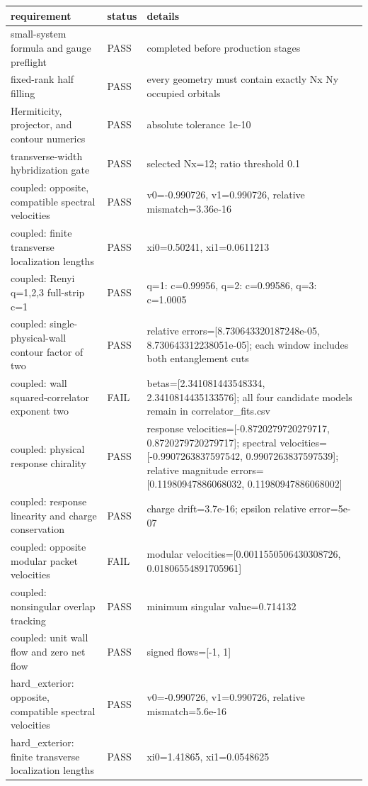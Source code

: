 \documentclass[aps,prb,onecolumn,nofootinbib,superscriptaddress]{revtex4-2}
\begin{document}
\begin{longtable}{p{}p{}p{}}
\toprule
requirement & status & details \\
\midrule
small-system formula and gauge preflight & PASS & completed before production stages \\
fixed-rank half filling & PASS & every geometry must contain exactly Nx Ny occupied orbitals \\
Hermiticity, projector, and contour numerics & PASS & absolute tolerance 1e-10 \\
transverse-width hybridization gate & PASS & selected Nx=12; ratio threshold 0.1 \\
coupled: opposite, compatible spectral velocities & PASS & v0=-0.990726, v1=0.990726, relative mismatch=3.36e-16 \\
coupled: finite transverse localization lengths & PASS & xi0=0.50241, xi1=0.0611213 \\
coupled: Renyi q=1,2,3 full-strip c=1 & PASS & q=1: c=0.99956, q=2: c=0.99586, q=3: c=1.0005 \\
coupled: single-physical-wall contour factor of two & PASS & relative errors=[8.730643320187248e-05, 8.730643312238051e-05]; each window includes both entanglement cuts \\
coupled: wall squared-correlator exponent two & FAIL & betas=[2.341081443548334, 2.3410814435133576]; all four candidate models remain in correlator\_fits.csv \\
coupled: physical response chirality & PASS & response velocities=[-0.8720279720279717, 0.8720279720279717]; spectral velocities=[-0.9907263837597542, 0.9907263837597539]; relative magnitude errors=[0.11980947886068032, 0.11980947886068002] \\
coupled: response linearity and charge conservation & PASS & charge drift=3.7e-16; epsilon relative error=5e-07 \\
coupled: opposite modular packet velocities & FAIL & modular velocities=[0.0011550506430308726, 0.01806554891705961] \\
coupled: nonsingular overlap tracking & PASS & minimum singular value=0.714132 \\
coupled: unit wall flow and zero net flow & PASS & signed flows=[-1, 1] \\
hard\_exterior: opposite, compatible spectral velocities & PASS & v0=-0.990726, v1=0.990726, relative mismatch=5.6e-16 \\
hard\_exterior: finite transverse localization lengths & PASS & xi0=1.41865, xi1=0.0548625 \\

\end{longtable}
\end{document}
